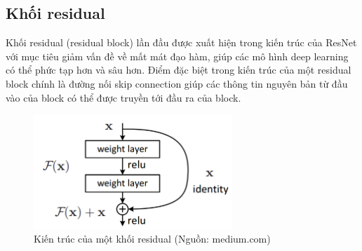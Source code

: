 {    \subsection{Khối residual}
    Khối residual (residual block) lần đầu được xuất hiện trong kiến trúc của ResNet \cite{resnet} với mục tiêu giảm vấn đề về mất mát đạo hàm, giúp các mô hình deep learning có thể phức tạp hơn và sâu hơn. Điểm đặc biệt trong kiến trúc của một residual block chính là đường nối skip connection giúp các thông tin nguyên bản từ đầu vào của block có thể được truyền tới đầu ra của block.

    \begin{figure}[H]
    \centering
    \includegraphics[width=7.5cm] {images/residual.png}
    \caption{Kiến trúc của một khối residual (Nguồn: medium.com)}
    \label{fig:residual}
    \end{figure}
}
